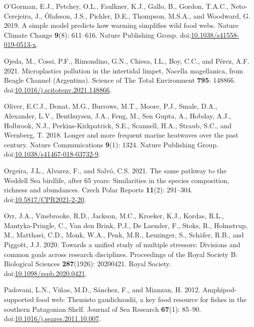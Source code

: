 \documentclass[
]{article}
\newlength{\cslhangindent}
\newenvironment{CSLReferences}[2] %
 {\begin{list}{}{%
  \setlength{\itemindent}{0pt}
  \setlength{\leftmargin}{0pt}
  \setlength{\parsep}{0pt}
  \ifodd #1
   \setlength{\leftmargin}{\cslhangindent}
   \setlength{\itemindent}{-1\cslhangindent}
  \fi
  \setlength{\itemsep}{#2\baselineskip}}}
 {\end{list}}
\begin{document}
\begin{CSLReferences}{1}{0}
O'Gorman, E.J., Petchey, O.L., Faulkner, K.J., Gallo, B., Gordon,
T.A.C., Neto-Cerejeira, J., Ólafsson, J.S., Pichler, D.E., Thompson,
M.S.A., and Woodward, G. 2019. A simple model predicts how warming
simplifies wild food webs. Nature Climate Change \textbf{9}(8):
611--616. Nature Publishing Group.
doi:\href{https://doi.org/10.1038/s41558-019-0513-x}{10.1038/s41558-019-0513-x}.

Ojeda, M., Cossi, P.F., Rimondino, G.N., Chiesa, I.L., Boy, C.C., and
Pérez, A.F. 2021. Microplastics pollution in the intertidal limpet,
{Nacella} magellanica, from {Beagle Channel} ({Argentina}). Science of
The Total Environment \textbf{795}: 148866.
doi:\href{https://doi.org/10.1016/j.scitotenv.2021.148866}{10.1016/j.scitotenv.2021.148866}.

Oliver, E.C.J., Donat, M.G., Burrows, M.T., Moore, P.J., Smale, D.A.,
Alexander, L.V., Benthuysen, J.A., Feng, M., Sen Gupta, A., Hobday,
A.J., Holbrook, N.J., Perkins-Kirkpatrick, S.E., Scannell, H.A., Straub,
S.C., and Wernberg, T. 2018. Longer and more frequent marine heatwaves
over the past century. Nature Communications \textbf{9}(1): 1324. Nature
Publishing Group.
doi:\href{https://doi.org/10.1038/s41467-018-03732-9}{10.1038/s41467-018-03732-9}.

Orgeira, J.L., Alvarez, F., and Salvó, C.S. 2021. The same pathway to
the {Weddell Sea} birdlife, after 65 years: Similarities in the species
composition, richness and abundances. Czech Polar Reports
\textbf{11}(2): 291--304.
doi:\href{https://doi.org/10.5817/CPR2021-2-20}{10.5817/CPR2021-2-20}.

Orr, J.A., Vinebrooke, R.D., Jackson, M.C., Kroeker, K.J., Kordas, R.L.,
Mantyka-Pringle, C., Van den Brink, P.J., De Laender, F., Stoks, R.,
Holmstrup, M., Matthaei, C.D., Monk, W.A., Penk, M.R., Leuzinger, S.,
Schäfer, R.B., and Piggott, J.J. 2020. Towards a unified study of
multiple stressors: Divisions and common goals across research
disciplines. Proceedings of the Royal Society B: Biological Sciences
\textbf{287}(1926): 20200421. Royal Society.
doi:\href{https://doi.org/10.1098/rspb.2020.0421}{10.1098/rspb.2020.0421}.

Padovani, L.N., Viñas, M.D., Sánchez, F., and Mianzan, H. 2012.
Amphipod-supported food web: {Themisto} gaudichaudii, a key food
resource for fishes in the southern {Patagonian Shelf}. Journal of Sea
Research \textbf{67}(1): 85--90.
doi:\href{https://doi.org/10.1016/j.seares.2011.10.007}{10.1016/j.seares.2011.10.007}.


\end{CSLReferences}
\end{document}
